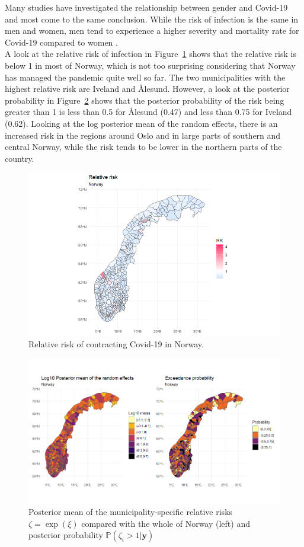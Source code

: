 Many studies have investigated the relationship between gender and Covid-19 and most come to the same conclusion. While the risk of infection is the same in men and women, men tend to experience a higher severity and mortality rate for Covid-19 compared to women \autocite[][]{mukherjee2021covid, gausman2020sex, spagnolo2020sex, kopel2020racial}. \\
A look at the relative risk of infection in Figure~\ref{rr_norway} shows that the relative risk is below 1 in most of Norway, which is not too surprising considering that Norway has managed the pandemic quite well so far. The two municipalities with the highest relative risk are Iveland and Ålesund. However, a look at the posterior probability in Figure~\ref{posterior_norway} shows that the posterior probability of the risk being greater than 1 is less than 0.5 for Ålesund (0.47) and less than 0.75 for Iveland (0.62). Looking at the log posterior mean of the random effects, there is an increased risk in the regions around Oslo and in large parts of southern and central Norway, while the risk tends to be lower in the northern parts of the country.
\begin{figure}[H]
  \centering
  \includegraphics[width = \textwidth]{relative_risk_norway.png}
  \caption{Relative risk of contracting Covid-19 in Norway.}
  \label{rr_norway}
\end{figure}
\begin{figure}[H]
  \centering
  \includegraphics[width = \textwidth]{posterior_norway.png}
  \caption{Posterior mean of the municipality-specific relative risks $\zeta=\exp{\left(\xi\right)}$ compared with the whole of Norway (left) and posterior probability $\mathbb{P}\left(\zeta_i>1|\pmb{y}\right)$}
  \label{posterior_norway}
\end{figure}
